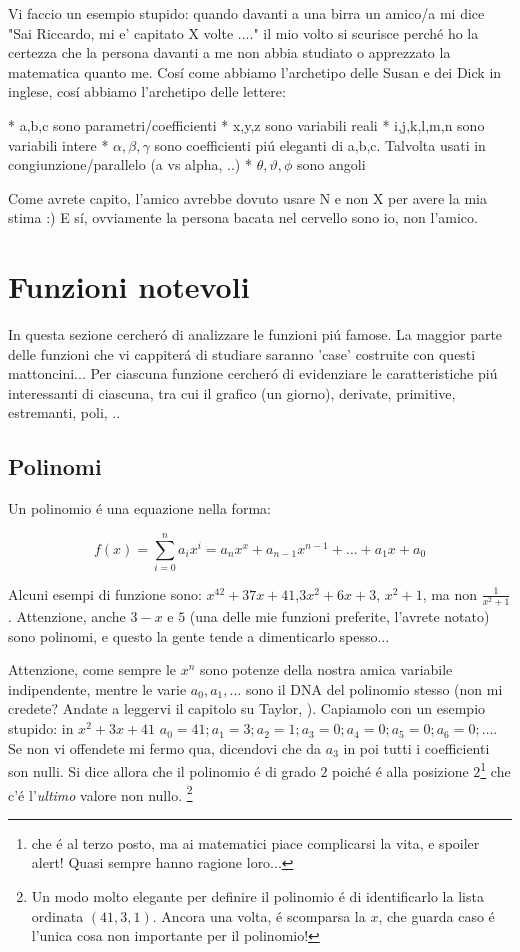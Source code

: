 Vi faccio un esempio stupido: quando davanti a una birra un amico/a mi dice "Sai Riccardo, mi e' capitato X volte ...." il mio
volto si scurisce perch\'e ho la certezza che la persona davanti a me non abbia studiato o apprezzato la matematica
quanto me. Cos\'i come abbiamo l'archetipo delle Susan e dei Dick in inglese, cos\'i abbiamo l'archetipo delle lettere:

* a,b,c sono parametri/coefficienti
* x,y,z sono variabili reali
* i,j,k,l,m,n sono variabili intere 
* $\alpha , \beta , \gamma$ sono coefficienti pi\'u eleganti di a,b,c. Talvolta usati in congiunzione/parallelo (a vs alpha, ..)
* $\theta, \vartheta, \phi$ sono angoli 

Come avrete capito, l'amico avrebbe dovuto usare N e non X per avere la mia stima :) E s\'i, ovviamente la persona bacata nel cervello sono io, non l'amico. 

\section{Funzioni notevoli}
In questa sezione cercher\'o di analizzare le funzioni pi\'u famose. La maggior parte delle funzioni che vi cappiter\'a di studiare
saranno 'case' costruite con questi mattoncini... Per ciascuna funzione cercher\'o di evidenziare le caratteristiche pi\'u
interessanti di ciascuna, tra cui il grafico (un giorno), derivate, primitive, estremanti, poli, ..

\subsection{Polinomi}

Un polinomio \'e una equazione nella forma:

\begin{equation}
f(x)= \sum_{i=0}^n a_ix^i = a_nx^x+a_{n-1}x^{n-1}+\ldots+a_1x+a_0
\end{equation}

Alcuni esempi di funzione sono: $x^42+37x+41$,$3x^2+6x+3$, $x^2+1$, ma non $\frac{1}{x^2+1}$. Attenzione, anche $3-x$ e $5$
(una delle mie funzioni preferite, l'avrete notato) sono polinomi, e questo la gente tende a dimenticarlo spesso...

Attenzione, come sempre le $x^n$ sono potenze della nostra amica variabile indipendente, mentre le varie $a_0,a_1,\ldots$
sono il DNA del polinomio stesso (non mi credete? Andate a leggervi il capitolo su Taylor, ). Capiamolo con un esempio
stupido: in $x^2+3x+41$ $a_0=41;a_1=3;a_2=1;a_3=0;a_4=0;a_5=0;a_6=0;\ldots$. Se non vi offendete mi fermo qua,
dicendovi che da $a_3$ in poi tutti i coefficienti son nulli. Si dice allora che il polinomio \'e di grado $2$
poich\'e \'e alla posizione $2$\footnote{che \'e al terzo posto, ma ai matematici piace complicarsi la vita,
e spoiler alert! Quasi sempre hanno ragione loro...} che c'\'e l'{\em ultimo} valore non nullo. \footnote{Un modo
molto elegante per definire il polinomio \'e di identificarlo la lista ordinata $(41,3,1)$. Ancora una volta, 
\'e scomparsa la $x$, che guarda caso \'e l'unica cosa non importante per il polinomio!}

